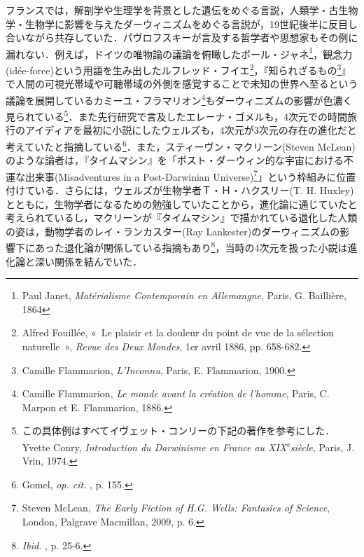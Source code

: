 フランスでは，解剖学や生理学を背景とした遺伝をめぐる言説，人類学・古生物学・生物学に影響を与えたダーウィニズムをめぐる言説が，19世紀後半に反目し合いながら共存していた．パヴロフスキーが言及する哲学者や思想家もその例に漏れない．例えば，ドイツの唯物論の議論を俯瞰したポール・ジャネ\footnote{Paul Janet, \emph{Matérialisme Contemporain en Allemangne}, Paris, G. Baillière, 1864}，観念力(idée-force)という用語を生み出したルフレッド・フイエ\footnote{Alfred Fouillée, «~Le plaisir et la douleur du point de vue de la sélection naturelle~», \emph{Revue des Deux Mondes}, 1er avril 1886, pp. 658-682.}，『知られざるもの\footnote{Camille Flammarion, \emph{L'Inconnu}, Paris, E. Flammarion, 1900.}』で人間の可視光帯域や可聴帯域の外側を感覚することで未知の世界へ至るという議論を展開しているカミーユ・フラマリオン\footnote{Camille Flammarion, \emph{Le monde avant la création de l'homme}, Paris,  C. Marpon et E. Flammarion, 1886.}もダーウィニズムの影響が色濃く見られている\footnote{この具体例はすべてイヴェット・コンリーの下記の著作を参考にした．Yvette Conry, \emph{Introduction du Darwinisme en France au XIX\textsuperscript{e}siècle}, Paris, J. Vrin, 1974.}．また先行研究で言及したエレーナ・ゴメルも，4次元での時間旅行のアイディアを最初に小説にしたウェルズも，4次元が3次元の存在の進化だと考えていたと指摘している\footnote{Gomel, \emph{op. cit. }, p. 155.}．また，スティーヴン・マクリーン(Steven McLean)のような論者は，『タイムマシン』を「ポスト・ダーウィン的な宇宙における不運な出来事(Misadventures in a Post-Darwinian Universe)\footnote{Steven McLean, \emph{The Early Fiction of H.G. Wells: Fantasies of Science}, London, Palgrave Macmillan, 2009, p. 6.}」という枠組みに位置付けている．さらには，ウェルズが生物学者Ｔ・Ｈ・ハクスリー(T. H. Huxley)とともに，生物学者になるための勉強していたことから，進化論に通じていたと考えられているし，マクリーンが『タイムマシン』で描かれている退化した人類の姿は，動物学者のレイ・ランカスター(Ray Lankester)のダーウィニズムの影響下にあった退化論が関係している指摘もあり\footnote{\emph{Ibid.} , p. 25-6.}，当時の4次元を扱った小説は進化論と深い関係を結んでいた．
